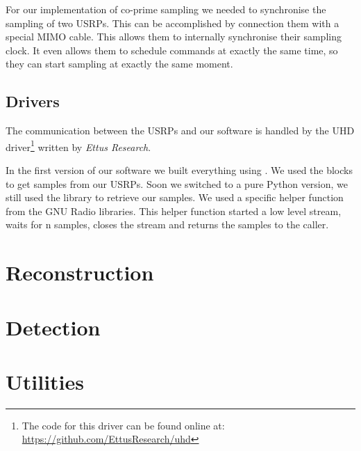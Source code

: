 \documentclass[a4paper, openany, oneside]{memoir}
\begin{document}
For our implementation of co-prime sampling we needed to synchronise the sampling of two USRPs. This can be accomplished by connection them with a special MIMO cable. This allows them to internally synchronise their sampling clock. It even allows them to schedule commands at exactly the same time, so they can start sampling at exactly the same moment.

\subsection{Drivers}
\label{sec:drivers}
The communication between the USRPs and our software is handled by the UHD driver\footnote{The code for this driver can be found online at: \url{https://github.com/EttusResearch/uhd}} written by \textit{Ettus Research}.

In the first version of our software we built everything using . We used the  blocks to get samples from our USRPs. Soon we switched to a pure Python version, we still used the  library to retrieve our samples. We used a specific helper function  from the GNU Radio libraries. This helper function started a low level stream, waits for n samples, closes the stream and returns the samples to the caller.




\section{Reconstruction}
\label{sec:reconstruction}

\section{Detection}
\label{sec:detection}

\section{Utilities}
\label{sec:utilities}
\end{document}
